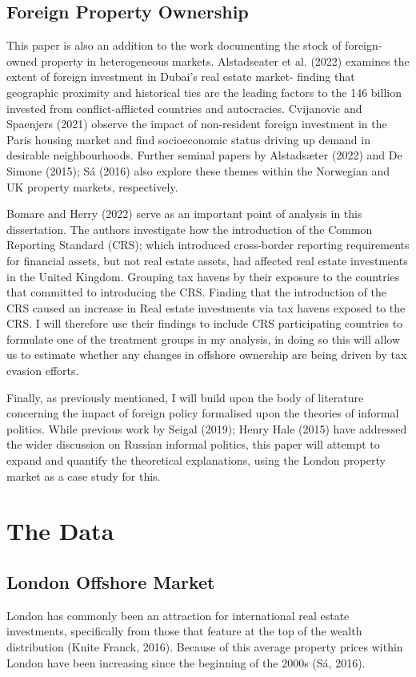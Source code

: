 \documentclass{article}
\begin{document}
\subsection{Foreign Property Ownership}

This paper is also an addition to the work documenting the stock of foreign-owned property in heterogeneous markets. Alstadseater et al. (2022) examines the extent of foreign investment in Dubai's real estate market- finding that geographic proximity and historical ties are the leading factors to the 146 billion invested from conflict-afflicted countries and autocracies. Cvijanovic and Spaenjers (2021) observe the impact of non-resident foreign investment in the Paris housing market and find socioeconomic status driving up demand in desirable neighbourhoods. Further seminal papers by Alstadsæter (2022) and De Simone (2015); Sá (2016) also explore these themes within the Norwegian and UK property markets, respectively. 

Bomare and Herry (2022) serve as an important point of analysis in this dissertation. The authors investigate how the introduction of the Common Reporting Standard (CRS); which introduced cross-border reporting requirements for financial assets, but not real estate assets, had affected real estate investments in the United Kingdom. Grouping tax havens by their exposure to the countries that committed to introducing the CRS. Finding that the introduction of the CRS caused an increase in Real estate investments via tax havens exposed to the CRS. I will therefore use their findings to include CRS participating countries to formulate one of the treatment groups in my analysis, in doing so this will allow us to estimate whether any changes in offshore ownership are being driven by tax evasion efforts. 


Finally, as previously mentioned, I will build upon the body of literature concerning the impact of foreign policy formalised upon the theories of informal politics. While previous work by Seigal (2019); Henry Hale (2015) have addressed the wider discussion on Russian informal politics, this paper will attempt to expand and quantify the theoretical explanations, using the London property market as a case study for this.

\section{The Data}
\subsection{London Offshore Market}
London has commonly been an attraction for international real estate investments, specifically from those that feature at the top of the wealth distribution (Knite Franck, 2016). Because of this average property prices within London have been increasing since the beginning of the 2000s (Sá, 2016). 
\end{document}
